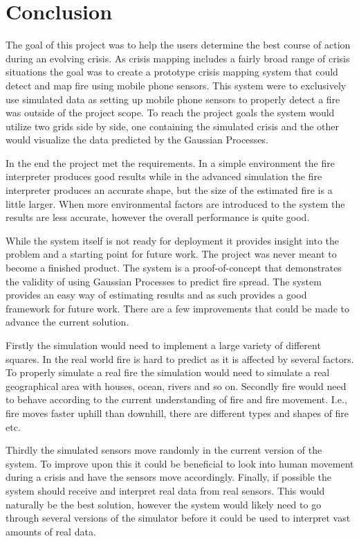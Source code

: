 \chapter{Conclusion}

The goal of this project was to help the users determine the best course of action during an evolving crisis. As crisis mapping includes a fairly broad range of crisis situations the goal was to create a prototype crisis mapping system that could detect and map fire using mobile phone sensors. This system were to exclusively use simulated data as setting up mobile phone sensors to properly detect a fire was outside of the project scope. To reach the project goals the system would utilize two grids side by side, one containing the simulated crisis and the other would visualize the data predicted by the Gaussian Processes.

In the end the project met the requirements. In a simple environment the fire interpreter produces good results while in the advanced simulation the fire interpreter produces an accurate shape, but the size of the estimated fire is a little larger. When more environmental factors are introduced to the system the results are less accurate, however the overall performance is quite good.

While the system itself is not ready for deployment it provides insight into the problem and a starting point for future work. The project was never meant to become a finished product. The system is a  proof-of-concept that demonstrates the validity of using Gaussian Processes to predict fire spread. The system provides an easy way of estimating results and as such provides a good framework for future work. There are a few improvements that could be made to advance the current solution.

Firstly the simulation would need to implement a large variety of different squares. In the real world fire is hard to predict as it is affected by several factors. To properly simulate a real fire the simulation would need to simulate a real geographical area with houses, ocean, rivers and so on. Secondly fire would need to behave according to the current understanding of fire and fire movement. I.e., fire moves faster uphill than downhill, there are different types and shapes of fire etc.

Thirdly the simulated sensors move randomly in the current version of the system. To improve upon this it could be beneficial to look into human movement during a crisis and have the sensors move accordingly. Finally, if possible the system should receive and interpret real data from real sensors. This would naturally be the best solution, however the system would likely need to go through several versions of the simulator before it could be used to interpret vast amounts of real data.